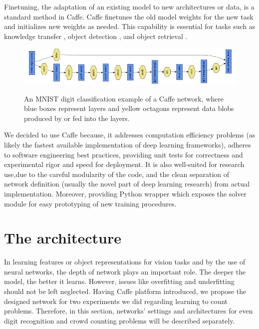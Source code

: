 \begin{enumerate}
\indent Finetuning, the adaptation of an existing model to new architectures or data, is a standard method in Caffe. Caffe  finetunes the old model weights for the new task and initializes new weights as needed. This capability is essential for tasks such as knowledge transfer \cite{donahue2013decaf}, object detection \cite{girshick2014rich}, and object retrieval \cite{guadarrama2014open} \cite{jia2014caffe}.  
\end{enumerate}

\begin{figure}[H]
	\centering
	{\includegraphics[width=1\textwidth]{images/caffe}}
	\caption{An MNIST digit classification example of a Caffe network, where blue boxes represent layers and yellow octagons represent data blobs produced by or fed into the layers\cite{jia2014caffe}.}
	\label{fig:caffe}
\end{figure}

We decided to use Caffe because, it addresses computation efficiency problems (as likely the fastest available implementation of deep learning frameworks), adheres to software engineering best practices, providing unit tests for correctness and experimental rigor and speed for deployment. It is also well-suited for research use,due to the careful modularity of the code, and the clean separation of network definition (usually the novel part of deep learning research) from actual implementation\cite{jia2014caffe}. Moreover, providing Python wrapper which exposes the solver module for easy prototyping of new training procedures. 

\section{The architecture}

In learning features or object representations for vision tasks and by the use of neural networks, the depth of network plays an important role. The deeper the model, the better it learns. However, issues like overfitting and underfitting should not be left neglected.   
Having Caffe platform introduced, we propose the designed network for two experiments we did regarding learning to count problems. Therefore, in this section, networks' settings and architectures for even digit recognition and crowd counting problems will be described separately. 

